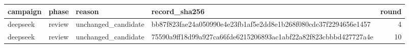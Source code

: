 \begin{tabular}{llllr}
\toprule
campaign & phase & reason & record\_sha256 & round \\
\midrule
deepseek & review & unchanged\_candidate & bb87f823fae24a050990e4e23fb1af5e2dd8e1b268f080cdc37f2294656e1457 & 4 \\
deepseek & review & unchanged\_candidate & 75590a9ff18d99a927ca66fde6215206893ac1abf22a82f823cbbbd427727a4e & 10 \\
\bottomrule
\end{tabular}
